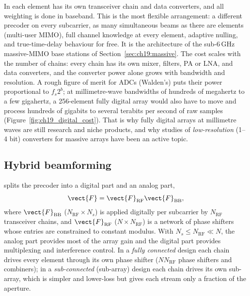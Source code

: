 In  each element has its own transceiver chain and data converters, and
all weighting is done in baseband. This is the most flexible arrangement: a different precoder on
every subcarrier, as many simultaneous beams as there are elements (multi-user MIMO), full channel
knowledge at every element, adaptive nulling, and true-time-delay behaviour for free. It is the
architecture of the sub-6\,GHz massive-MIMO base stations of Section~\ref{sec:ch19:massive}. The
cost scales with the number of chains: every chain has its own mixer, filters, PA or LNA, and data
converters, and the converter power alone grows with bandwidth and resolution. A rough figure of
merit for ADCs (Walden's) puts their power proportional to $f_s2^b$; at millimetre-wave bandwidths of
hundreds of megahertz to a few gigahertz, a 256-element fully digital array would also have to move
and process hundreds of gigabits to several terabits per second of raw samples (Figure~\ref{fig:ch19_digital_cost}).
That is why fully digital arrays at millimetre waves are still research and niche products, and why
studies of \emph{low-resolution} (1--4 bit) converters for massive arrays have been an active topic.


\subsection{Hybrid beamforming}

 splits the precoder into a digital part and an analog part,
\begin{equation}
\vect{F}=\vect{F}_{\text{RF}}\vect{F}_{\text{BB}},
\label{eq:ch19:hybrid}
\end{equation}
where $\vect{F}_{\text{BB}}$ ($N_{\text{RF}}\times N_s$) is applied digitally per subcarrier by
$N_{\text{RF}}$ transceiver chains, and $\vect{F}_{\text{RF}}$ ($N\times N_{\text{RF}}$) is a network of
phase shifters whose entries are constrained to constant modulus. With $N_s\le N_{\text{RF}}\ll N$,
the analog part provides most of the array gain and the digital part provides multiplexing and
interference control. In a \emph{fully connected} design each chain drives every element through
its own phase shifter ($NN_{\text{RF}}$ phase shifters and combiners); in a \emph{sub-connected}
(sub-array) design each chain drives its own sub-array, which is simpler and lower-loss but gives
each stream only a fraction of the aperture.

